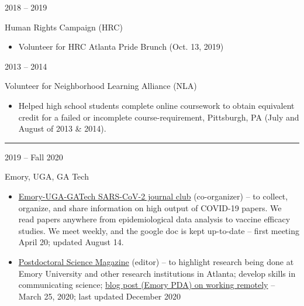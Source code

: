 \documentclass[a4paper,10pt]{article}
\newlength{\cvcolumngapwidth}
\newlength{\cvleftcolumnwidth}
\newlength{\cvrightcolumnwidth}
\newcommand{\cvsectionstyle}[1]{{\normalsize\cvsectionfont\textcolor{cvsectioncolor}{#1}}}
\newcommand{\cvtitlestyle}[1]{{\large\cvtitlefont\textcolor{cvtitlecolor}{#1}}}
\newcommand{\cvheadingstyle}[1]{{\normalsize\cvheadingfont\textcolor{cvheadingcolor}{#1}}}
\newlength{\cvafteritemskipamount}
\newlength{\cvaftersectionskipamount}
\newlength{\cvbetweensectionandheadingextraskipamount}
\newlength{\cvaftertitleskipamount}
\newlength{\cvparskip}
\newcommand{\cvsection}[1]{
            \begin{minipage}[t]{\cvleftcolumnwidth}
                \raggedleft\cvsectionstyle{#1}
            \end{minipage}%
            \hspace{\cvcolumngapwidth}%
            \begin{minipage}[t]{\cvrightcolumnwidth}
                \textcolor{cvrulecolor}{\rule{\cvrightcolumnwidth}{0.3mm}}
            \end{minipage}
        
            \vspace{\cvaftersectionskipamount}
        }
\newcommand{\cvitem}[2]{
            \begin{minipage}[t]{\cvleftcolumnwidth}
                \raggedleft #1
            \end{minipage}%
            \hspace{\cvcolumngapwidth}%
            \begin{minipage}[t]{\cvrightcolumnwidth}
                \setlength{\parskip}{\cvparskip} #2
            \end{minipage}
        
            \vspace{\cvafteritemskipamount}
        }
\newcommand{\cvtitle}[1]{
            \cvtitlestyle{#1}
        
            \vspace{\cvaftertitleskipamount}
            \vspace{-\cvparskip}
        }
\begin{document}
        
        \cvitem{
            \cvheadingstyle{2018 -- 2019}
        }{
            \cvtitle{Human Rights Campaign (HRC)}
        
            \begin{itemize}[leftmargin=*]
            	\item Volunteer for HRC Atlanta Pride Brunch (Oct. 13, 2019)
        
            \end{itemize}
        
        }
        
          \cvitem{
            \cvheadingstyle{2013 -- 2014}
        }{
            \cvtitle{Volunteer for Neighborhood Learning Alliance (NLA)}
            \begin{itemize}[leftmargin=*]
               	\item Helped high school students complete online coursework to obtain equivalent
        credit for a failed or incomplete course-requirement, Pittsburgh, PA (July and August of 2013 \& 2014).
            \end{itemize}  
        }
        
        
      
    
        
        \cvsection{GROUPS \& ORGANIZATIONS}
        \vspace{\cvbetweensectionandheadingextraskipamount}
        
        \cvitem{
            \cvheadingstyle{2019 -- Fall 2020}
        }{
            \cvtitle{Emory, UGA, GA Tech}
            \begin{itemize}[leftmargin=*]
                	\item \href{https://docs.google.com/document/d/1jMU-Rc--9MpwKwmoHNcR_SD4T0128dSvHaiJtECwO50/edit?usp=sharing}{Emory-UGA-GATech SARS-CoV-2 journal club} (co-organizer) --  to collect, organize, and share information on high output of COVID-19 papers. We read papers anywhere from epidemiological data analysis to vaccine efficacy studies. We meet weekly, and the google doc is kept up-to-date -- first meeting April 20; updated August 14.
            	\item \href{https://emorypda.wordpress.com/postdoc-newsletter/}{Postdoctoral Science Magazine} (editor) --  to highlight research being done at Emory University and other research institutions in Atlanta; develop skills in communicating science; \href{https://emorypda.wordpress.com/2020/03/25/working-remotely-here-are-some-tips-to-stay-safe-and-productive-during-a-pandemic/}{blog post (Emory PDA) on working remotely} -- March 25, 2020; last updated December 2020 \\
            \end{itemize}
        }
        
\end{document}
